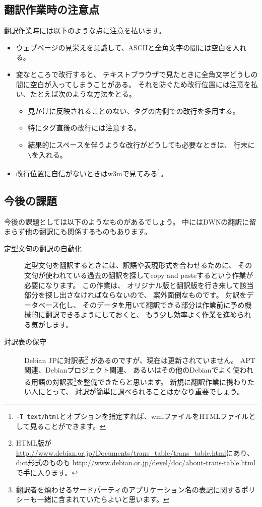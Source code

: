 \documentclass[mingoth,a4paper]{jsarticle}
\begin{document}
\subsection{翻訳作業時の注意点}
\label{subsec:translation-care}

翻訳作業時には以下のような点に注意を払います。

\begin{itemize}
 \item ウェブページの見栄えを意識して、ASCIIと全角文字の間には空白を入れる。
 \item 変なところで改行すると、
   テキストブラウザで見たときに全角文字どうしの間に空白が入ってしまうことがある。
  それを防ぐため改行位置には注意を払い、たとえば次のような方法をとる。
 \begin{itemize}
  \item 見かけに反映されることのない、タグの内側での改行を多用する。
  \item 特にタグ直後の改行には注意する。
  \item 結果的にスペースを伴うような改行がどうしても必要なときは、
    行末に\verb|\|を入れる。
 \end{itemize}
 \item 改行位置に自信がないときはw3mで見てみる\footnote{\texttt{-T text/html}とオプションを指定すれば、wmlファイルをHTMLファイルとして見ることができます。}。
\end{itemize}

\subsection{今後の課題}

今後の課題としては以下のようなものがあるでしょう。
中にはDWNの翻訳に留まらず他の翻訳にも関係するものもあります。

\begin{description}
 \item[定型文句の翻訳の自動化]
   定型文句を翻訳するときには、訳語や表現形式を合わせるために、
   その文句が使われている過去の翻訳を探してcopy and pasteするという作業が必要になります。
   この作業は、
   オリジナル版と翻訳版を行き来して該当部分を探し出さなければならないので、
   案外面倒なものです。
   対訳をデータベース化し、
   そのデータを用いて翻訳できる部分は作業前に予め機械的に翻訳できるようにしておくと、
   もう少し効率よく作業を進められる気がします。
 \item[対訳表の保守]
   Debian JPに対訳表\footnote{HTML版が\url{http://www.debian.or.jp/Documents/trans_table/trans_table.html}にあり、
	    dict形式のものも
	    \url{http://www.debian.or.jp/devel/doc/about-trans-table.html}
	    で手に入ります。} があるのですが、現在は更新されていません。
   APT関連、Debianプロジェクト関連、
   あるいはその他のDebianでよく使われる用語の対訳表\footnote{翻訳者を煩わせるサードパーティのアプリケーション名の表記に関するポリシーも一緒に含まれていたらよいと思います。}を整備できたらと思います。
   新規に翻訳作業に携わりたい人にとって、
   対訳が簡単に調べられることはかなり重要でしょう。
\end{description}
\end{document}
